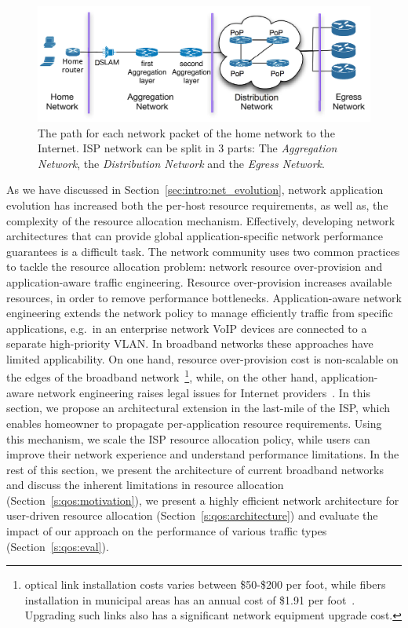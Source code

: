 \begin{figure}
  \centering
  \includegraphics[width=0.95\columnwidth]{isp_plan}
  \caption{\label{fig:isp_plan} The path for each network packet of 
    the home network to the Internet. ISP network can be split in 3 parts:
  The {\it Aggregation Network}, the {\it Distribution Network}\/ and the {\it
    Egress Network}.}
\end{figure}

As we have discussed in Section~\ref{sec:intro:net_evolution}, network
application evolution has increased both the per-host resource requirements, as
well as, the complexity of the resource allocation mechanism. Effectively,
developing network architectures that can provide global application-specific
network performance guarantees is a difficult task. The network community uses
two common practices to tackle the resource allocation problem: network resource
over-provision and application-aware traffic engineering.  Resource
over-provision increases available resources, in order to remove performance
bottlenecks.  Application-aware network engineering extends the network policy
to  manage efficiently traffic from specific applications, e.g.~in an enterprise
network VoIP devices are connected to a separate high-priority VLAN\@. In
broadband networks these approaches have limited applicability. On one hand,
resource over-provision cost is non-scalable on the edges of the broadband
network~\footnote{optical link installation costs varies between \$50-\$200 per
  foot, while fibers installation in municipal areas has an annual cost of
  \$1.91 per foot~\cite{backhaul-cost}. Upgrading such links also has a
  significant network equipment upgrade cost.}, while, on the other hand,
application-aware network engineering raises legal issues for Internet
providers~\cite{hahn06}. In this section, we propose an architectural extension
in the last-mile of the ISP, which enables homeowner to propagate
per-application resource requirements. Using this mechanism, we scale the ISP
resource allocation policy, while users can improve their network experience and
understand performance limitations.  In the rest of this section, we present the
architecture of current broadband networks and discuss the inherent limitations
in resource allocation (Section~\ref{s:qos:motivation}), we present a highly
efficient network architecture for user-driven resource allocation
(Section~\ref{s:qos:architecture}) and evaluate the impact of our approach on
the performance of various traffic types (Section~\ref{s:qos:eval}).

